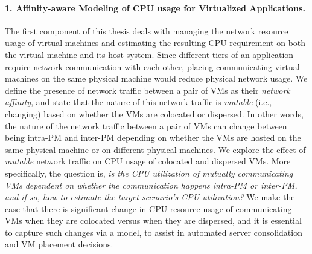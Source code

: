 \paragraph{1. Affinity-aware Modeling of CPU usage for Virtualized Applications.}
The first component of this thesis deals with managing the network 
resource usage of virtual machines and estimating the resulting CPU 
requirement on both the virtual machine 
and its host system.
Since different tiers of an application require network
communication with each other, placing communicating virtual
machines on the same physical machine 
would reduce physical network 
usage. We define the presence of network traffic between a pair
of VMs as their \textit{network affinity}, 
and state that the
nature of this network traffic is \textit{mutable} 
(i.e., changing) based on
whether the VMs are colocated or 
dispersed. In other words, the
nature of the network traffic between a pair of VMs
can change between being
intra-PM and inter-PM 
depending on whether the VMs are hosted
on the same physical machine or on different physical machines.
We explore the effect of \textit{mutable}
network traffic on CPU usage of colocated and dispersed VMs. More
specifically, the question is, \textit{is the CPU utilization of mutually
communicating VMs dependent on whether the communication happens
intra-PM or inter-PM, and if so, 
how to estimate the target scenario's CPU utilization?}
We make the case that there is significant change in CPU resource
usage of communicating VMs when they are colocated versus when they are 
dispersed, and it is
essential to capture such changes via a model, to assist in
automated server consolidation 
and VM placement decisions.

